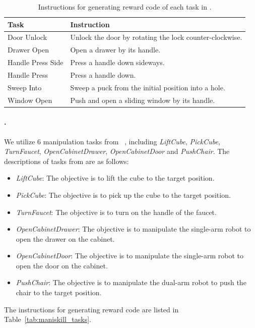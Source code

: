 \documentclass{article}
\theoremstyle{plain}
\theoremstyle{definition}
\theoremstyle{remark}
\begin{document}
\begin{table}[!ht]
\centering
\caption{Instructions for generating reward code of each task in \MW.}
\begin{tabular}{ll}
\toprule
    \textbf{Task} & \textbf{Instruction} \\
\midrule
    Door Unlock & Unlock the door by rotating the lock counter-clockwise. \\
    Drawer Open & Open a drawer by its handle. \\
    Handle Press Side & Press a handle down sideways. \\
    Handle Press & Press a handle down. \\
    Sweep Into & Sweep a puck from the initial position into a hole. \\
    Window Open & Push and open a sliding window by its handle. \\
\bottomrule
\end{tabular}
\label{tab:metaworld_tasks}
\end{table}

\paragraph{\MS.}
We utilize $6$ manipulation tasks from \MS~\cite{ManiSkill2}, including \textit{LiftCube}, \textit{PickCube}, \textit{TurnFaucet}, \textit{OpenCabinetDrawer}, \textit{OpenCabinetDoor} and \textit{PushChair}. The descriptions of tasks from \MS are as follows:
\begin{itemize}[leftmargin=20pt]
    \item \textit{LiftCube}: The objective is to lift the cube to the target position.
    \item \textit{PickCube}: The objective is to pick up the cube to the target position.
    \item \textit{TurnFaucet}: The objective is to turn on the handle of the faucet.
    \item \textit{OpenCabinetDrawer}: The objective is to manipulate the single-arm robot to open the drawer on the cabinet.
    \item \textit{OpenCabinetDoor}: The objective is to manipulate the single-arm robot to open the door on the cabinet.
    \item \textit{PushChair}: The objective is to manipulate the dual-arm robot to push the chair to the target position.
\end{itemize}
The instructions for generating reward code are listed in Table~\ref{tab:maniskill_tasks}.
\end{document}

